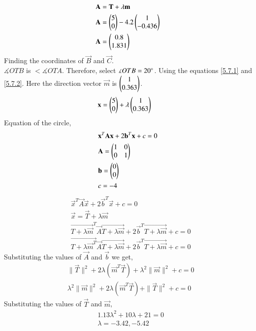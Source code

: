 \documentclass[journal,12pt,twocolumn]{IEEEtran}
\renewcommand\thesection{\arabic{section}}
\begin{document}
\begin{enumerate}[label=\thesection.\arabic*.,ref=\thesection.\theenumi]
\begin{align}
& \mathbf{A} = \mathbf{T} +\lambda\mathbf{m}\\
& \mathbf{A} = \begin{pmatrix}5\\0\end{pmatrix} -4.2\begin{pmatrix}1\\-0.436\end{pmatrix}\\
& \mathbf{A} = \begin{pmatrix}0.8\\1.831\end{pmatrix}
\end{align}
Finding the coordinates of $\vec{B}$ and $\vec{C}$.\\
$\measuredangle{OTB}$ is $< \measuredangle{OTA}$. Therefore, select $\measuredangle{OTB} = 20\degree$. Using the equations \eqref{5.7.1} and \eqref{5.7.2}. Here the direction vector $\vec{m}$ is $\begin{pmatrix}1\\0.363\end{pmatrix}$.\\
\begin{align}& \vec{x} = \myvec{5\\0} +\lambda\myvec{1\\0.363}\end{align}
Equation of the circle,
\begin{align}
& \mathbf{x}^T\mathbf{A}\mathbf{x} +2\mathbf{b}^T\mathbf{x}+c=0\\ \label{5.7.2}
&\mathbf{A} = \begin{pmatrix}1&0\\0&1\end{pmatrix}\\
&\mathbf{b} = \begin{pmatrix}0\\0\end{pmatrix}\\
&c = -4
\end{align}
\begin{align}
& \vec{x}^T\vec{A}\vec{x} +2\vec{b}^T\vec{x}+c=0\\
& \vec{x} = \vec{T} +\lambda\vec{m} \\
& \vec{T+\lambda\vec{m}}^T\vec{A}\vec{T+\lambda\vec{m}} +2\vec{b}^T \vec{T+\lambda\vec{m}}+c = 0 \\
& \vec{T+\lambda\vec{m}^T}\vec{A}\vec{T+\lambda\vec{m}} +2\vec{b}^T \vec{T+\lambda\vec{m}}+c = 0
\end{align}
Substituting the values of $\vec{A}$ and $\vec{b}$ we get,
\begin{align}
& \|\vec{T}\|^2+2\lambda(\vec{m}^T\vec{T})+\lambda^2\|\vec{m}\|^2+c = 0 \\
& \lambda^2\|\vec{m}\|^2 +2\lambda(\vec{m}^T\vec{T}) + \|\vec{T}\|^2 + c = 0
\end{align}
Substituting the values of $\vec{T}$ and $\vec{m}$,
\begin{align}
&1.13\lambda^2 +10\lambda +21 = 0\\
&\lambda = -3.42,-5.42
\end{align}

\end{enumerate}
\end{document}
